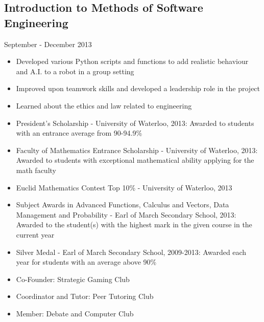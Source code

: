 \documentclass[12pt]{article}
\begin{document}
\begin{minipage}[t]{0.8\linewidth}
	\subsection*{Introduction to Methods of Software Engineering}\vspace{-6pt} 
		\noindent \hfill September - December 2013
		\begin{itemize}
			\item Developed various Python scripts and functions to add realistic behaviour and A.I. to a	 								robot in a group setting
			\item Improved upon teamwork skills and developed a leadership role in the project 				
			\item Learned about the ethics and law related to engineering 
		\end{itemize} \vspace{24pt}    
	
	\begin{itemize}
		\item President's Scholarship - University of Waterloo, 2013: Awarded to students with an entrance average 				from 90-94.9\%
		\item Faculty of Mathematics Entrance Scholarship - University of Waterloo, 2013: Awarded to students with 				exceptional mathematical ability applying for the math faculty
		\item Euclid Mathematics Contest Top 10\% - University of Waterloo, 2013	
		\item Subject Awards in Advanced Functions, Calculus and Vectors, Data Management and Probability - Earl 						of March Secondary School, 2013: Awarded to the student(s) with the highest mark in the given 						course in the current year
		\item Silver Medal - Earl of March Secondary School, 2009-2013: Awarded each year for students with an 						average above 90\%
	\end{itemize} \vspace{24pt}
	
	\begin{itemize}
		\item Co-Founder: Strategic Gaming Club
		\item Coordinator and Tutor: Peer Tutoring Club
		\item Member: Debate and Computer Club 
	\end{itemize} 
\end{minipage}
	
\end{document}
